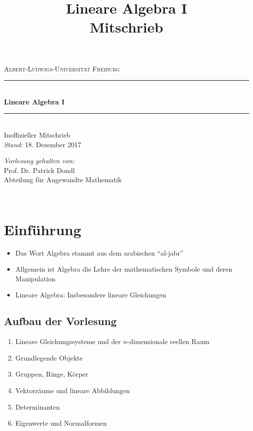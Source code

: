 \documentclass{report}
\title{Lineare Algebra I\\Mitschrieb}
\theoremstyle{customrem}
\theoremstyle{customdef}
\begin{document}
\begin{titlepage}
	\newcommand{\HRule}{\rule{\linewidth}{0.5mm}}
	\center
	\vspace{6cm}
	\textsc{\large Albert-Ludwigs-Universität Freiburg}\\[0.5cm] 
	\vspace{4cm}
	\HRule \\[0.8cm]
	{ \Huge  \textbf{Lineare Algebra $\mathbf{I}$}}\\[0.4cm] 
	\HRule \\[.5cm]
	{\Large Inoffizieller Mitschrieb}\\[1.0cm]
	\textsl{Stand}: 18. Dezember 2017
	\\[12.5cm]
	\begin{minipage}{0.5\textwidth}
		\begin{center} \large
			\textsl{Vorlesung gehalten von:}\\[1cm]
			Prof. Dr. Patrick Dondl\\
			Abteilung für Angewandte Mathematik\\
		\end{center}
	\end{minipage}\\[2.5cm]
	\thispagestyle{empty}
\end{titlepage}


\section*{Einführung}
	\begin{itemize}
		\item Das Wort Algebra stammt aus dem arabischen "`al-jabr"'
		\item Allgemein ist Algebra die Lehre der mathematischen Symbole und deren Manipulation
		\item Lineare Algebra: Insbesondere lineare Gleichungen
	\end{itemize}

\subsection*{Aufbau der Vorlesung}
	\begin{enumerate}
		\item Lineare Gleichungssysteme und der $n$-dimensionale reellen Raum
		\item Grundlegende Objekte
		\item Gruppen, Ringe, Körper
		\item Vektorräume und lineare Abbildungen
		\item Determinanten
		\item Eigenwerte und Normalformen
	\end{enumerate}
\end{document}

